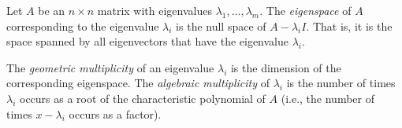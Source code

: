 \begin{SaveDefinition}[key=Eigenspace, title={Eigenspace}]
	Let $A$ be an $n\times n$ matrix with eigenvalues
	$\lambda_{1},\ldots,\lambda_{m}$. The
	\emph{eigenspace} of $A$ corresponding to the eigenvalue $\lambda_{i}$
	is the null space of $A-\lambda_{i} I$. That is, it is the space spanned
	by all eigenvectors that have the eigenvalue $\lambda_{i}$.

	The
	\emph{geometric multiplicity} of an eigenvalue $\lambda_{i}$ is the
	dimension of the corresponding eigenspace. The
	\emph{algebraic multiplicity} of $\lambda_{i}$ is the number of times
	$\lambda_{i}$ occurs as a root of the characteristic polynomial of $A$ (i.e.,
	the number of times $x-\lambda_{i}$ occurs as a factor).
\end{SaveDefinition}


